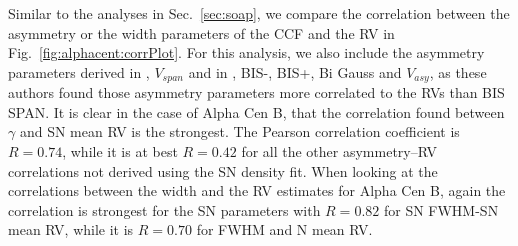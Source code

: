 \documentclass{aa}
\begin{document}
Similar to the analyses in Sec.~\ref{sec:soap}, we compare the correlation between the asymmetry or the width parameters of the CCF and the RV in Fig.~\ref{fig:alphacent:corrPlot}. 
For this analysis, we also include the asymmetry parameters derived in \citet{Boisse-2011}, $V_{span}$ and in \citet{Figueira-2013}, BIS-, BIS+, Bi Gauss and $V_{asy}$, as these authors found those asymmetry parameters more correlated to the RVs than BIS SPAN. It is clear in the case of Alpha Cen B, that the correlation found between $\gamma$ and SN mean RV is the strongest. 
The Pearson correlation coefficient is $R=0.74$, while it is at best $R=0.42$ for all the other asymmetry--RV correlations not derived using the SN density fit.
When looking at the correlations between the width and the RV estimates for Alpha Cen B, again the correlation is strongest for the SN parameters with $R=0.82$ for SN FWHM-SN mean RV, while it is $R=0.70$ for FWHM and N mean RV.
%
%
\end{document}
